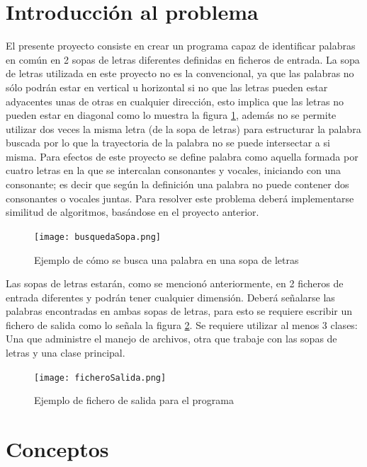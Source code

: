 \documentclass[letterpaper,12pt]{report}
\begin{document}
\section {Introducci\'on al problema}

El presente proyecto consiste en crear un programa capaz de identificar palabras en común en 2 sopas de letras diferentes definidas en ficheros de entrada. La sopa de letras utilizada en este proyecto no es la convencional, ya que las palabras no sólo podrán estar en vertical u horizontal si no que las letras pueden estar adyacentes unas de otras en cualquier dirección, esto implica que las letras no pueden estar en diagonal como lo muestra la figura \ref{fig:busquedaEnSopa}, además no se permite utilizar dos veces la misma letra (de la sopa de letras) para estructurar la palabra buscada por lo que la trayectoria de la palabra no se puede intersectar a si misma. Para efectos de este proyecto se define palabra como aquella formada por cuatro letras en la que se intercalan consonantes y vocales, iniciando con una consonante; es decir que según la definición una palabra no puede contener dos consonantes o vocales juntas. Para resolver este problema deberá implementarse similitud de algoritmos, basándose en el proyecto anterior.

\begin{figure}[h]
    \centering
    \texttt{[image: busquedaSopa.png]}
    \caption{Ejemplo de cómo se busca una palabra en una sopa de letras}
    \label{fig:busquedaEnSopa}
\end{figure}

Las sopas de letras estarán, como se mencionó anteriormente, en 2 ficheros de entrada diferentes y podrán tener cualquier dimensión. Deberá señalarse las palabras encontradas en ambas sopas de letras, para esto se requiere escribir un fichero de salida como lo señala la figura \ref{fig:ficheroSalida}. Se requiere utilizar al menos 3 clases: Una que administre el manejo de archivos, otra que trabaje con las sopas de letras y una clase principal.


\begin{figure}[h]
    \centering
    \texttt{[image: ficheroSalida.png]}
    \caption{Ejemplo de fichero de salida para el programa}
    \label{fig:ficheroSalida}
\end{figure}

\section {Conceptos}
\end{document}
